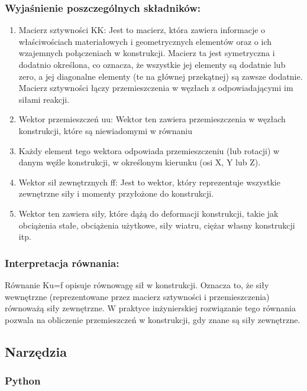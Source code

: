 \subsubsection*{Wyjaśnienie poszczególnych składników:}
\begin{enumerate}
\item Macierz sztywności KK:
Jest to macierz, która zawiera informacje o właściwościach materiałowych i geometrycznych elementów oraz o ich wzajemnych połączeniach w konstrukcji. Macierz ta jest symetryczna i dodatnio określona, co oznacza, że wszystkie jej elementy są dodatnie lub zero, a jej diagonalne elementy (te na głównej przekątnej) są zawsze dodatnie. Macierz sztywności łączy przemieszczenia w węzłach z odpowiadającymi im siłami reakcji.


\item Wektor przemieszczeń uu:
Wektor ten zawiera przemieszczenia w węzłach konstrukcji, które są niewiadomymi w równaniu
\item Każdy element tego wektora odpowiada przemieszczeniu (lub rotacji) w danym węźle konstrukcji, w określonym kierunku (osi X, Y lub Z).


\item Wektor sił zewnętrznych ff:
Jest to wektor, który reprezentuje wszystkie zewnętrzne siły i momenty przyłożone do konstrukcji.
\item Wektor ten zawiera siły, które dążą do deformacji konstrukcji, takie jak obciążenia stałe, obciążenia użytkowe, siły wiatru, ciężar własny konstrukcji itp.


\end{enumerate}

\subsubsection*{Interpretacja równania:}
Równanie Ku=f opisuje równowagę sił w konstrukcji.
Oznacza to, że siły wewnętrzne (reprezentowane przez macierz sztywności i przemieszczenia) równoważą siły zewnętrzne.
W praktyce inżynierskiej rozwiązanie tego równania pozwala na obliczenie przemieszczeń w konstrukcji, gdy znane są siły zewnętrzne.

\subsection{Narzędzia}
\subsubsection{Python}


